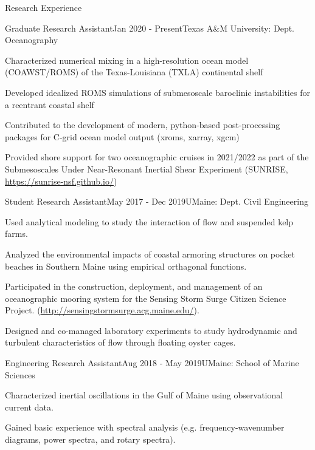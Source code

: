 \documentclass{resume} %
\begin{document}
\begin{rSection}{Research Experience}
\begin{rSubsection}{Graduate Research Assistant}{Jan 2020 - Present}{Texas A$\&$M University: Dept. Oceanography}{} 
\item Characterized numerical mixing in a high-resolution ocean model (COAWST/ROMS) of the Texas-Louisiana (TXLA) continental shelf
\item Developed idealized ROMS simulations of submesoscale baroclinic instabilities for a reentrant coastal shelf
\item Contributed to the development of modern, python-based post-processing packages for C-grid ocean model output (xroms, xarray, xgcm)
\item Provided shore support for two oceanographic cruises in 2021/2022 as part of the Submesoscales Under Near-Resonant Inertial Shear Experiment (SUNRISE, \url{https://sunrise-nsf.github.io/})
\end{rSubsection}    

\begin{rSubsection}{Student Research Assistant}{May 2017 - Dec 2019}{UMaine: Dept. Civil Engineering}{} 
\item Used analytical modeling to study the interaction of flow and suspended kelp farms.  
\item Analyzed the environmental impacts of coastal armoring structures on pocket beaches in Southern Maine using empirical orthagonal functions.
\item Participated in the construction, deployment, and management of an oceanographic mooring system for the Sensing Storm Surge Citizen Science Project. (\url{http://sensingstormsurge.acg.maine.edu/}).
\item Designed and co-managed laboratory experiments to study hydrodynamic and turbulent characteristics of flow through floating oyster cages.
\end{rSubsection}

\begin{rSubsection}{Engineering Research Assistant}{Aug 2018 - May 2019}{UMaine: School of Marine Sciences}{}
\item Characterized inertial oscillations in the Gulf of Maine using observational current data.
\item Gained basic experience with spectral analysis (e.g. frequency-wavenumber diagrams, power spectra, and rotary spectra).
\end{rSubsection}


\end{rSection}
\end{document}

